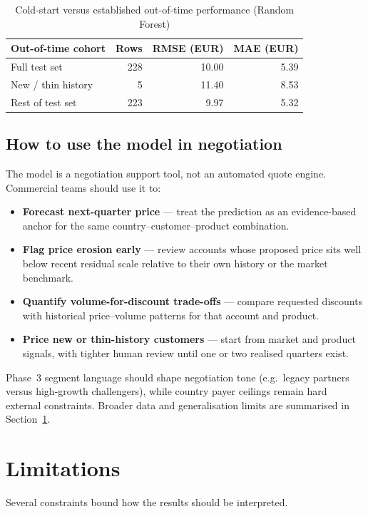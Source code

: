 \documentclass{article}
\begin{document}
\begin{table}[H]
\centering
\small
\begin{tabular}{@{}lrrr@{}}
\toprule
\textbf{Out-of-time cohort} & \textbf{Rows} & \textbf{RMSE (EUR)} & \textbf{MAE (EUR)} \\
\midrule
Full test set & 228 & 10.00 & 5.39 \\
New / thin history & 5 & 11.40 & 8.53 \\
Rest of test set & 223 & 9.97 & 5.32 \\
\bottomrule
\end{tabular}
\caption{Cold-start versus established out-of-time performance (Random Forest)}
\label{tab:phase4_coldstart}
\end{table}

\subsection{How to use the model in negotiation}

The model is a negotiation support tool, not an automated quote engine. Commercial teams should use it to:

\begin{itemize}
    \item \textbf{Forecast next-quarter price} --- treat the prediction as an evidence-based anchor for the same country--customer--product combination.
    \item \textbf{Flag price erosion early} --- review accounts whose proposed price sits well below recent residual scale relative to their own history or the market benchmark.
    \item \textbf{Quantify volume-for-discount trade-offs} --- compare requested discounts with historical price--volume patterns for that account and product.
    \item \textbf{Price new or thin-history customers} --- start from market and product signals, with tighter human review until one or two realised quarters exist.
\end{itemize}

Phase~3 segment language should shape negotiation tone (e.g.\ legacy partners versus high-growth challengers), while country payer ceilings remain hard external constraints. Broader data and generalisation limits are summarised in Section~\ref{sec:limitations}.

\clearpage


\section{Limitations}
\label{sec:limitations}
Several constraints bound how the results should be interpreted.
\end{document}
